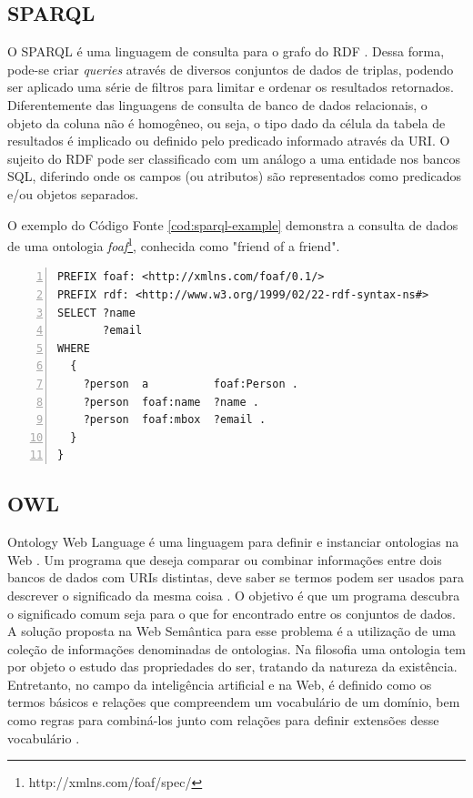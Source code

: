 \subsection{SPARQL}

O SPARQL é uma linguagem de consulta para o grafo do RDF \citep{SparqlW3C}. Dessa forma, pode-se criar \textit{queries} através de diversos conjuntos de dados de triplas, podendo ser aplicado uma série de filtros para limitar e ordenar os resultados retornados. Diferentemente das linguagens de consulta de banco de dados relacionais, o objeto da coluna não é homogêneo, ou seja, o tipo dado da célula da tabela de resultados é implicado ou definido pelo predicado informado através da URI. O sujeito do RDF pode ser classificado com um análogo a uma entidade nos bancos SQL, diferindo onde os campos (ou atributos) são representados como predicados e/ou objetos separados.

O exemplo do Código Fonte \ref{cod:sparql-example} demonstra a consulta de dados de uma ontologia \textit{foaf}\footnote{http://xmlns.com/foaf/spec/}, conhecida como "friend of a friend".

\begin{lstlisting}[caption=Exemplo de consulta na linguagem SPARQL, language=SPARQL, frame=single, label={cod:sparql-example}, float, numbers=left]
PREFIX foaf: <http://xmlns.com/foaf/0.1/>
PREFIX rdf: <http://www.w3.org/1999/02/22-rdf-syntax-ns#>
SELECT ?name 
       ?email
WHERE
  {
    ?person  a          foaf:Person .
    ?person  foaf:name  ?name .
    ?person  foaf:mbox  ?email .
  }
}
\end{lstlisting}

\subsection{OWL}

Ontology Web Language é uma linguagem para definir e instanciar ontologias na Web \citep{OWLW3C}. Um programa que deseja comparar ou combinar informações entre dois bancos de dados com URIs distintas, deve saber se termos podem ser usados para descrever o significado da mesma coisa \citep{bernerslee2001semantic}. O objetivo é que um programa descubra o significado comum seja para o que for encontrado entre os conjuntos de dados. A solução proposta na Web Semântica para esse problema é a utilização de uma coleção de informações denominadas de ontologias. Na filosofia uma ontologia tem por objeto o estudo das propriedades do ser, tratando da natureza da existência. Entretanto, no campo da inteligência artificial e na Web, é definido como os termos básicos e relações que compreendem um vocabulário de um domínio, bem como regras para combiná-los junto com relações para definir extensões desse vocabulário \citep{Patil:1992:DKS:3087223.3087302}.

